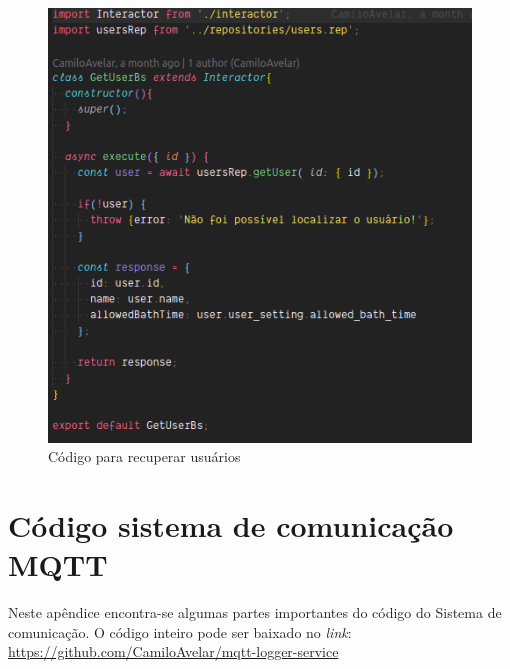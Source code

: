 \begin{figure}[htbp]
	\centering
	\includegraphics[width=1\linewidth]{figuras/userservice/getuser.png}
	\caption{Código para recuperar usuários}
	\label{fig:getuser}
\end{figure}

\chapter{Código sistema de comunicação MQTT}

Neste apêndice encontra-se algumas partes importantes do código do Sistema de comunicação. O código inteiro pode ser baixado no \textit{link}: \url{https://github.com/CamiloAvelar/mqtt-logger-service}

